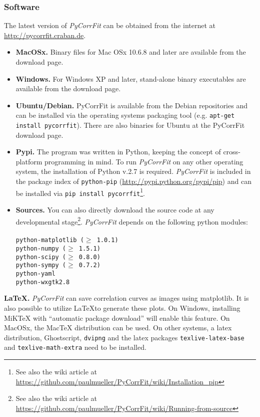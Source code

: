 \subsubsection{Software}
\label{sec:intro.prere.softw}
The latest version of \textit{PyCorrFit} can be obtained from the internet at \url{http://pycorrfit.craban.de}.
\begin{itemize}
\item \textbf{MacOSx.}
Binary files for Mac OSx 10.6.8 and later are available from the download page.
\item \textbf{Windows.}
For Windows XP and later, stand-alone binary executables are available from the download page. 
\item \textbf{Ubuntu/Debian.}
PyCorrFit is available from the Debian repositories and can be installed via the operating systems packaging tool (e.g. \texttt{apt-get install pycorrfit}). There are also binaries for Ubuntu at the PyCorrFit download page.
\item\textbf{Pypi.} The program was written in Python, keeping the concept of cross-platform programming in mind. To run \textit{PyCorrFit} on any other operating system, the installation of Python v.2.7 is required. \textit{PyCorrFit} is included in the package index of \texttt{python-pip} (\url{http://pypi.python.org/pypi/pip}) and can be installed via
\texttt{pip~install~pycorrfit}\footnote{See also the wiki article at \url{https://github.com/paulmueller/PyCorrFit/wiki/Installation_pip}}.
\item \textbf{Sources.}
You can also directly download the source code at any developmental stage\footnote{See also the wiki article at \url{https://github.com/paulmueller/PyCorrFit/wiki/Running-from-source}}. \textit{PyCorrFit} depends on the following python modules:\\
\texttt{\\
python-matplotlib ($\geq$ 1.0.1) \\
python-numpy ($\geq$ 1.5.1) \\
python-scipy ($\geq$ 0.8.0) \\
python-sympy ($\geq$ 0.7.2) \\
python-yaml \\
python-wxgtk2.8 \\
}
\end{itemize}


\vspace{1em}
\noindent \textbf{\LaTeX .} \textit{PyCorrFit} can save correlation curves as images using matplotlib. It is also possible to utilize \LaTeX to generate these plots. On Windows, installing MiKTeX  with ``automatic package download'' will enable this feature. On MacOSx, the MacTeX distribution can be used. On other systems, a latex distribution, Ghostscript, \texttt{dvipng} and the latex packages \texttt{texlive-latex-base} and \texttt{texlive-math-extra} need to be installed.

